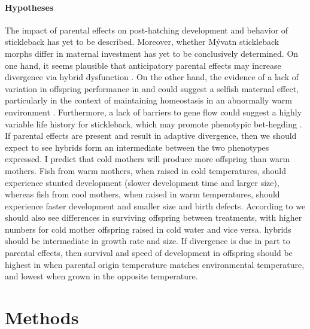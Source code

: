 \documentclass[12pt]{extarticle}
\begin{document}
\paragraph{Hypotheses}
The impact of parental effects on post-hatching development and behavior of stickleback has yet to be described. Moreover, whether M\'yvatn stickleback morphs differ in maternal investment has yet to be conclusively determined. On one hand, it seems plausible that anticipatory parental effects may increase divergence via hybrid dysfunction \citep{Marshall2008}. On the other hand, the evidence of a lack of variation in offspring performance in \citet{Senn} and \citet{Diethelm} could suggest a selfish maternal effect, particularly in the context of maintaining homeostasis in an abnormally warm environment \citep{Marshall2008}. Furthermore, a lack of barriers to gene flow could suggest a highly variable life history for stickleback, which may promote phenotypic bet-hegding \citep{Marshall2008}.
If parental effects are present and result in adaptive divergence, then we should expect to see hybrids form an intermediate between the two phenotypes expressed. I predict that cold mothers will produce more offspring than warm mothers. Fish from warm mothers, when raised in cold temperatures, should experience stunted development (slower development time and larger size), whereas fish from cool mothers, when raised in warm temperatures, should experience faster development and smaller size and birth defects.
According to \citet{Senn} we should also see differences in surviving offspring between treatments, with higher numbers for cold mother offspring raised in cold water and vice versa. hybrids should be intermediate in growth rate and size.
If divergence is due in part to parental effects, then survival and speed of development in offspring should be highest in when parental origin temperature matches environmental temperature, and lowest when grown in the opposite temperature.





\section*{Methods}
\end{document}

